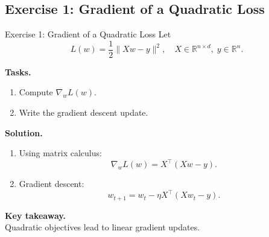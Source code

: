 \documentclass[aspectratio=169,11pt]{beamer}
\begin{document}
\subsection{Exercise 1: Gradient of a Quadratic Loss}
\begin{frame}[t,allowframebreaks]{Exercise 1: Gradient of a Quadratic Loss}
\small
Let
\[
L(w) = \frac{1}{2}\|Xw - y\|^2, \quad X \in \mathbb{R}^{n \times d}, \; y \in \mathbb{R}^n.
\]

\textbf{Tasks.}\\ \begin{enumerate}
    \item Compute $\nabla_w L(w)$.
    \item Write the gradient descent update.
\end{enumerate}

\textbf{Solution.}\\ \begin{enumerate}
\item Using matrix calculus:
\[
\nabla_w L(w) = X^\top (Xw - y).
\]

\item Gradient descent:
\[
w_{t+1} = w_t - \eta X^\top (Xw_t - y).
\]
\end{enumerate}

\textbf{Key takeaway.}\\ Quadratic objectives lead to linear gradient updates.
\end{frame}
\end{document}
